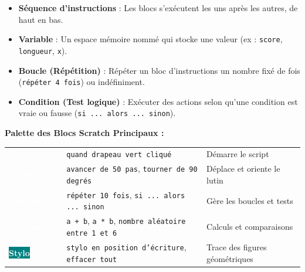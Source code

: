 \begin{cadredef}
\begin{itemize}[leftmargin=1.5em, itemsep=2pt]
    \item \textbf{Séquence d'instructions} : Les blocs s'exécutent les uns après les autres, de haut en bas.
    \item \textbf{Variable} : Un espace mémoire nommé qui stocke une valeur (ex : \texttt{score}, \texttt{longueur}, \texttt{x}).
    \item \textbf{Boucle (Répétition)} : Répéter un bloc d'instructions un nombre fixé de fois (\texttt{répéter 4 fois}) ou indéfiniment.
    \item \textbf{Condition (Test logique)} : Exécuter des actions selon qu'une condition est vraie ou fausse (\texttt{si ... alors ... sinon}).
\end{itemize}
\end{cadredef}

\begin{center}
\begin{tcolorbox}[colback=colPrimary!10, colframe=colPrimary, width=0.98\linewidth, arc=4pt, boxrule=1pt, top=4pt, bottom=4pt, left=6pt, right=6pt]
\sffamily\bfseries\footnotesize\centering
Palette des Blocs Scratch Principaux :\\[3pt]
\begin{tabular}{lll}
\colorbox{amber!80!black}{\textcolor{white}{\textbf{ Événements }}} & \texttt{quand drapeau vert cliqué} & Démarre le script \\
\colorbox{blue!70!black}{\textcolor{white}{\textbf{ Mouvement }}} & \texttt{avancer de 50 pas}, \texttt{tourner de 90 degrés} & Déplace et oriente le lutin \\
\colorbox{orange!90!black}{\textcolor{white}{\textbf{ Contrôle }}} & \texttt{répéter 10 fois}, \texttt{si ... alors ... sinon} & Gère les boucles et tests \\
\colorbox{green!60!black}{\textcolor{white}{\textbf{ Opérateurs }}} & \texttt{a + b}, \texttt{a * b}, \texttt{nombre aléatoire entre 1 et 6} & Calculs et comparaisons \\
\colorbox{teal}{\textcolor{white}{\textbf{ Stylo }}} & \texttt{stylo en position d'écriture}, \texttt{effacer tout} & Trace des figures géométriques
\end{tabular}
\end{tcolorbox}
\end{center}

